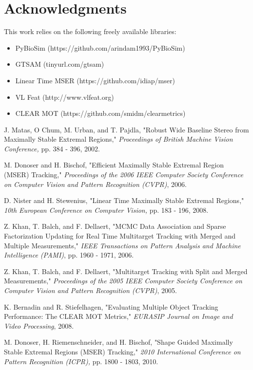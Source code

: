 \documentclass[conference]{IEEEtran}
\begin{document}
\section*{Acknowledgments}

This work relies on the following freely available libraries:

\begin{itemize}
  \item PyBioSim (https://github.com/arindam1993/PyBioSim)
  \item GTSAM (tinyurl.com/gtsam)
  \item Linear Time MSER (https://github.com/idiap/mser)
  \item VL Feat (http://www.vlfeat.org)
  \item CLEAR MOT (https://github.com/smidm/clearmetrics)
\end{itemize}

\begin{thebibliography}{1}

 J. Matas, O Chum, M. Urban, and T. Pajdla, "Robust Wide Baseline Stereo from Maximally Stable Extremal Regions," \emph{Proceedings of British Machine Vision Conference,} pp. 384 - 396, 2002.

 M. Donoser and H. Bischof, "Efficient Maximally Stable Extremal Region (MSER) Tracking," \emph{Proceedings of the 2006 IEEE Computer Society Conference on Computer Vision and Pattern Recognition (CVPR)}, 2006.

 D. Nister and H. Stewenius, "Linear Time Maximally Stable Extremal Regions," \emph{10th European Conference on Computer Vision,} pp. 183 - 196, 2008.

 Z. Khan, T. Balch, and F. Dellaert, "MCMC Data Association and Sparse Factorization Updating for Real Time Multitarget Tracking with Merged and Multiple Measurements," \emph{IEEE Transactions on Pattern Analysis and Machine Intelligence (PAMI)}, pp. 1960 - 1971, 2006.

 Z. Khan, T. Balch, and F. Dellaert, "Multitarget Tracking with Split and Merged Measurements," \emph{Proceedings of the 2005 IEEE Computer Society Conference on Computer Vision and Pattern Recognition (CVPR)}, 2005.

 K. Bernadin and R. Stiefelhagen, "Evaluating Multiple Object Tracking Performance: The CLEAR MOT Metrics," \emph{EURASIP Journal on Image and Video Processing}, 2008.

 M. Donoser, H. Riemenschneider, and H. Bischof, "Shape Guided Maximally Stable Extremal Regions (MSER) Tracking," \emph{2010 International Conference on Pattern Recognition (ICPR),} pp. 1800 - 1803, 2010.

\end{thebibliography} 
\end{document}
